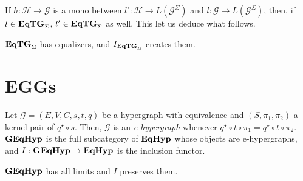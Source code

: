 \documentclass[a4paper,UKenglish,cleveref,pdftex,thm-restate,numberwithinsect]{lipics-v2021}
\newcommand{\catname}[1]{\textbf{\textup{#1}}}
\newcommand{\EqHyp}{\catname{EqHyp}} %
\newcommand{\EqTGs}{\catname{EqTG}_{\Sigma}}
\newcommand{\egg}{\catname{GEqHyp}}
\begin{document}
If $h: \mathcal{H \to G}$ is a mono between $l': \mathcal{H} \to L(\mathcal{G}^\Sigma)$ and $l: \mathcal{G}\to L(\mathcal{G}^\Sigma)$, then, if $l\in\EqTGs$, $l'\in\EqTGs$ as well. This let us deduce what follows.

\begin{proposition}
	$\EqTGs$ has equalizers, and $I_{\EqTGs}$ creates them.
\end{proposition}


\section{EGGs}
\label{eggs}


\begin{definition}
	Let $\mathcal{G} = (E, V, C, s, t, q)$ be a hypergraph with equivalence and $(S, \pi_1, \pi_2)$ a kernel pair of $q^\star \circ s$.
	Then, $\mathcal{G}$ is an \emph{e-hypergraph} whenever $q^\star \circ t \circ \pi_1 = q^\star \circ t \circ \pi_2$.
	$\egg$ is the full subcategory of $\EqHyp$ whose objects are e-hypergraphs, and $I: \egg \to \EqHyp$ is the inclusion functor.
\end{definition}

\begin{lemma}
	$\egg$ has all limits and $I$ preserves them.
\end{lemma}
\end{document}

